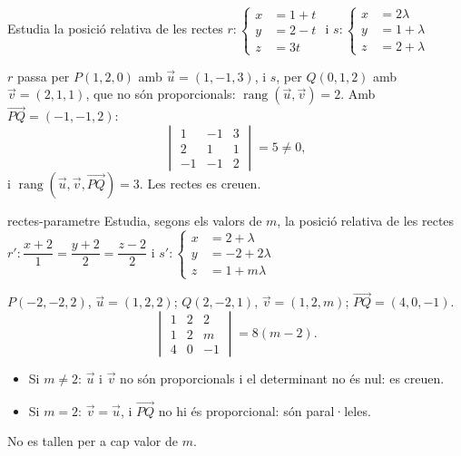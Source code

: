 \begin{apartats}

Estudia la posició relativa de les rectes
$r\colon\left\{\begin{aligned}x&=1+t\\y&=2-t\\z&=3t\end{aligned}\right.$ i
$s\colon\left\{\begin{aligned}x&=2\lambda\\y&=1+\lambda\\z&=2+\lambda\end{aligned}\right.$

\begin{solucio}
$r$ passa per $P(1,2,0)$ amb $\vec u=(1,-1,3)$, i $s$, per $Q(0,1,2)$ amb $\vec v=(2,1,1)$, que no són
proporcionals: $\operatorname{rang}(\vec u,\vec v)=2$. Amb $\overrightarrow{PQ}=(-1,-1,2)$:
\[
\begin{vmatrix}1&-1&3\\2&1&1\\-1&-1&2\end{vmatrix}=5\ne0,
\]
i $\operatorname{rang}(\vec u,\vec v,\overrightarrow{PQ})=3$. Les rectes es creuen.
\end{solucio}

\begin{tria}{rectes-parametre}
Estudia, segons els valors de $m$, la posició relativa de les rectes
$r'\colon\dfrac{x+2}{1}=\dfrac{y+2}{2}=\dfrac{z-2}{2}$ i
$s'\colon\left\{\begin{aligned}x&=2+\lambda\\y&=-2+2\lambda\\z&=1+m\lambda\end{aligned}\right.$

\begin{solucio}
$P(-2,-2,2)$, $\vec u=(1,2,2)$; $Q(2,-2,1)$, $\vec v=(1,2,m)$; $\overrightarrow{PQ}=(4,0,-1)$.
\[
\begin{vmatrix}1&2&2\\1&2&m\\4&0&-1\end{vmatrix}=8(m-2).
\]
\begin{itemize}
\item Si $m\ne2$: $\vec u$ i $\vec v$ no són proporcionals i el determinant no és nul: es creuen.
\item Si $m=2$: $\vec v=\vec u$, i $\overrightarrow{PQ}$ no hi és proporcional: són paral·leles.
\end{itemize}
No es tallen per a cap valor de $m$.
\end{solucio}


\end{tria}
\end{apartats}
